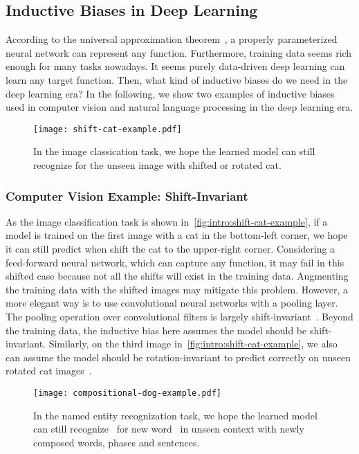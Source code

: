 \subsection{Inductive Biases in Deep Learning}
\label{ssec:intro:bias-source}
According to the universal approximation
theorem~\citep{hornik1989multilayer}, a properly parameterized neural
network can represent any function. Furthermore, training data seems
rich enough for many tasks nowadays. It seems purely data-driven deep
learning can learn any target function. Then, what kind of inductive
biases do we need in the deep learning era? In the following, we show two
examples of inductive biases used in computer vision and natural
language processing in the deep learning era.

\begin{figure}[!th]
  \centering
  \texttt{[image: shift-cat-example.pdf]}
  \caption{\label{fig:intro:shift-cat-example}In the image classication
    task, we hope the learned model can still recognize  for the
    unseen image with shifted or rotated cat.}
\end{figure}

\subsubsection{Computer Vision Example: Shift-Invariant}
\label{sssec:intro:cv-example}

As the image classification task is shown
in~\autoref{fig:intro:shift-cat-example}, if a model is trained on the
first image with a cat in the bottom-left corner, we hope it can still
predict  when shift the cat to the upper-right corner.
Considering a feed-forward neural network, which can capture any
function, it may fail in this shifted case because not all the shifts
will exist in the training data. Augmenting the training data with the
shifted images may mitigate this problem. However, a more elegant way
is to use convolutional neural networks with a pooling layer. The
pooling operation over convolutional filters is largely
shift-invariant~\citep{zhang2019making}. Beyond the training data, the
inductive bias here assumes the model should be shift-invariant.
Similarly, on the third image
in~\autoref{fig:intro:shift-cat-example}, we also can assume the model
should be rotation-invariant to predict correctly on unseen rotated
cat images~\citep{cheng2016rifd}.

\begin{figure}[!th]
  \centering
  \texttt{[image: compositional-dog-example.pdf]}
  \caption{\label{fig:intro:compositional-dog-example}In the named entity
    recognization task, we hope the learned model can still recognize
    ~for new word~ in unseen context with newly composed
    words, phases and sentences.}
\end{figure}

